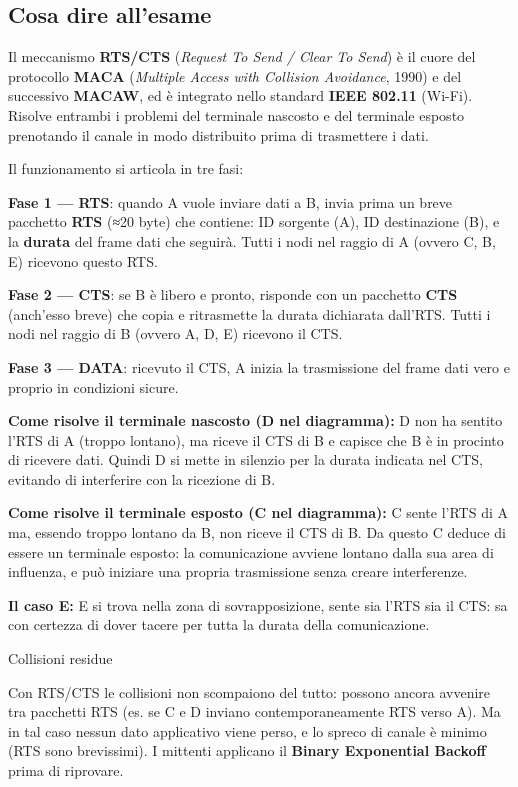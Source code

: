 \documentclass[
  italian,
  openany]{book}
\begin{document}
\subsection{Cosa dire all'esame}\label{cosa-dire-allesame-2}

Il meccanismo \textbf{RTS/CTS} (\emph{Request To Send / Clear To Send})
è il cuore del protocollo \textbf{MACA} (\emph{Multiple Access with
Collision Avoidance}, 1990) e del successivo \textbf{MACAW}, ed è
integrato nello standard \textbf{IEEE 802.11} (Wi-Fi). Risolve entrambi
i problemi del terminale nascosto e del terminale esposto prenotando il
canale in modo distribuito prima di trasmettere i dati.

Il funzionamento si articola in tre fasi:

\textbf{Fase 1 --- RTS}: quando A vuole inviare dati a B, invia prima un
breve pacchetto \textbf{RTS} (≈20 byte) che contiene: ID sorgente (A),
ID destinazione (B), e la \textbf{durata} del frame dati che seguirà.
Tutti i nodi nel raggio di A (ovvero C, B, E) ricevono questo RTS.

\textbf{Fase 2 --- CTS}: se B è libero e pronto, risponde con un
pacchetto \textbf{CTS} (anch'esso breve) che copia e ritrasmette la
durata dichiarata dall'RTS. Tutti i nodi nel raggio di B (ovvero A, D,
E) ricevono il CTS.

\textbf{Fase 3 --- DATA}: ricevuto il CTS, A inizia la trasmissione del
frame dati vero e proprio in condizioni sicure.

\textbf{Come risolve il terminale nascosto (D nel diagramma):} D non ha
sentito l'RTS di A (troppo lontano), ma riceve il CTS di B e capisce che
B è in procinto di ricevere dati. Quindi D si mette in silenzio per la
durata indicata nel CTS, evitando di interferire con la ricezione di B.

\textbf{Come risolve il terminale esposto (C nel diagramma):} C sente
l'RTS di A ma, essendo troppo lontano da B, non riceve il CTS di B. Da
questo C deduce di essere un terminale esposto: la comunicazione avviene
lontano dalla sua area di influenza, e può iniziare una propria
trasmissione senza creare interferenze.

\textbf{Il caso E:} E si trova nella zona di sovrapposizione, sente sia
l'RTS sia il CTS: sa con certezza di dover tacere per tutta la durata
della comunicazione.

\begin{callouttip}{Collisioni residue}

Con RTS/CTS le collisioni non scompaiono del tutto: possono ancora
avvenire tra pacchetti RTS (es. se C e D inviano contemporaneamente RTS
verso A). Ma in tal caso nessun dato applicativo viene perso, e lo
spreco di canale è minimo (RTS sono brevissimi). I mittenti applicano il
\textbf{Binary Exponential Backoff} prima di riprovare.

\end{callouttip}
\end{document}
